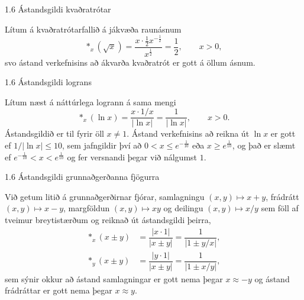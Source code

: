 %
\begin{frame}{1.6 Ástandsgildi kvaðratrótar} 

Lítum á kvaðratrótarfallið á jákvæða
raunásnum
\begin{equation*}
    \ast_x(\sqrt x) = 
    \dfrac{x\cdot \frac 12 x^{-\frac 12}}{x^{\frac 12}} =
    \dfrac 12, \qquad x>0,
\end{equation*}
svo ástand verkefnisins að ákvarða kvaðratrót er gott á öllum ásnum.

\end{frame}
%
%
\begin{frame}{1.6 Ástandsgildi lograns} 

Lítum næst á náttúrlega logrann á sama mengi
\begin{equation*}
    \ast_x(\ln x) = 
    \dfrac{x\cdot 1/x}{|\ln x|}=\dfrac 1{|\ln x|}, 
    \qquad x>0.
\end{equation*}
Ástandsgildið er til fyrir öll $x\neq 1$. Ástand verkefnisins að reikna út $\ln x$ er gott ef $1/|\ln x|\leq 10$, sem jafngildir því að $0<x\leq e^{-\frac 1{10}}$ eða 
$x \geq e^{\frac 1{10}}$, og það er slæmt ef $e^{-\frac
1{10}}<x<e^{\frac 1{10}}$ og fer versnandi þegar við nálgumst $1$.
%
\end{frame}

%
\begin{frame}{1.6 Ástandsgildi grunnaðgerðanna fjögurra} 


Við getum litið á grunnaðgerðirnar fjórar, samlagningu $(x,y)\mapsto x+y$, frádrátt $(x,y)\mapsto x-y$, margföldun $(x,y)\mapsto xy$ og deilingu $(x,y)\mapsto x/y$ sem föll af tveimur breytistærðum og reiknað út ástandsgildi þeirra,
\begin{align*}
    \ast_x(x\pm y) &= 
    \dfrac {|x\cdot 1|}{|x\pm y|} = 
    \dfrac{1}{|1\pm y/x|},\\
    \ast_y(x\pm y) &= 
    \dfrac {|y\cdot 1|}{|x\pm y|} = 
    \dfrac{1}{|1\pm x/y|},
\end{align*}
sem sýnir okkur að ástand samlagningar er gott nema þegar 
$x\approx -y$ og ástand frádráttar er gott nema þegar $x\approx y$.

\end{frame}
%

